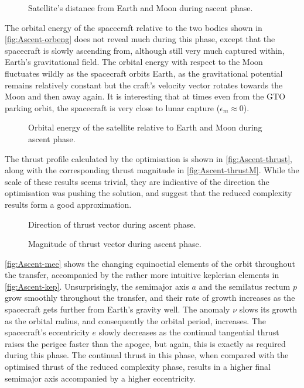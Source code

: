 \begin{figure}
\caption{Satellite's distance from Earth and Moon during ascent phase.}
\label{fig:Ascent-dist}
\centering
\def\svgwidth{\figurewidth}

\end{figure}

The orbital energy of the spacecraft relative to the two bodies shown in \autoref{fig:Ascent-orbeng} does not reveal much during this phase, except that the spacecraft is slowly ascending from, although still very much captured within, Earth's gravitational field. The orbital energy with respect to the Moon fluctuates wildly as the spacecraft orbits Earth, as the gravitational potential remains relatively constant but the craft's velocity vector rotates towards the Moon and then away again. It is interesting that at times even from the GTO parking orbit, the spacecraft is very close to lunar capture ($\epsilon_m\approx0$).

\begin{figure}
\caption{Orbital energy of the satellite relative to Earth and Moon during ascent phase.}
\label{fig:Ascent-orbeng}
\centering
\def\svgwidth{\figurewidth}

\end{figure}

The thrust profile calculated by the optimisation is shown in \autoref{fig:Ascent-thrust}, along with the corresponding thrust magnitude in \autoref{fig:Ascent-thrustM}. While the scale of these results seems trivial, they are indicative of the direction the optimisation was pushing the solution, and suggest that the reduced complexity results form a good approximation. 

\begin{figure}
\caption{Direction of thrust vector during ascent phase.}
\label{fig:Ascent-thrust}
\centering
\def\svgwidth{\figurewidth}

\end{figure}

\begin{figure}
\caption{Magnitude of thrust vector during ascent phase.}
\label{fig:Ascent-thrustM}
\centering
\def\svgwidth{\figurewidth}

\end{figure}

\autoref{fig:Ascent-mee} shows the changing equinoctial elements of the orbit throughout the transfer, accompanied by the rather more intuitive keplerian elements in \autoref{fig:Ascent-kep}. Unsurprisingly, the semimajor axis $a$ and the semilatus rectum $p$ grow smoothly throughout the transfer, and their rate of growth increases as the spacecraft gets further from Earth's gravity well. The anomaly $\nu$ slows its growth as the orbital radius, and consequently the orbital period, increases. The spacecraft's eccentricity $e$ slowly decreases as the continual tangential thrust raises the perigee faster than the apogee, but again, this is exactly as required during this phase. The continual thrust in this phase, when compared with the optimised thrust of the reduced complexity phase, results in a higher final semimajor axis accompanied by a higher eccentricity.

